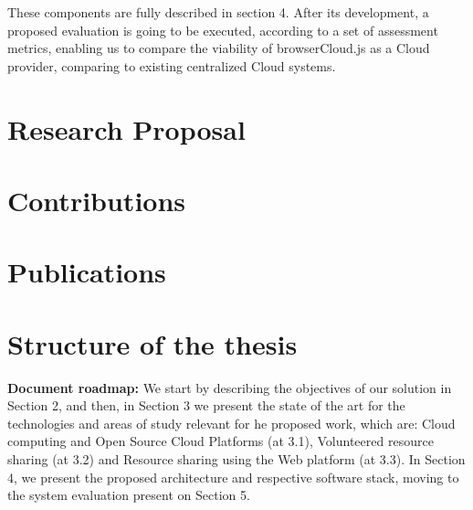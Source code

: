 These components are fully described in section 4. After its development, a proposed evaluation is going to be executed, according to a set of assessment metrics, enabling us to compare the viability of browserCloud.js as a Cloud provider, comparing to existing centralized Cloud systems.

\section{Research Proposal}

\section{Contributions}

\section{Publications}

\section{Structure of the thesis}

\textbf{Document roadmap:} We start by describing the objectives of our solution in Section 2, and then, in Section 3 we present the state of the art for the technologies and areas of study relevant for he proposed work, which are: Cloud computing and Open Source Cloud Platforms (at 3.1), Volunteered resource sharing (at 3.2) and Resource sharing using the Web platform (at 3.3). In Section 4, we present the proposed architecture and respective software stack, moving to the system evaluation present on Section 5.



